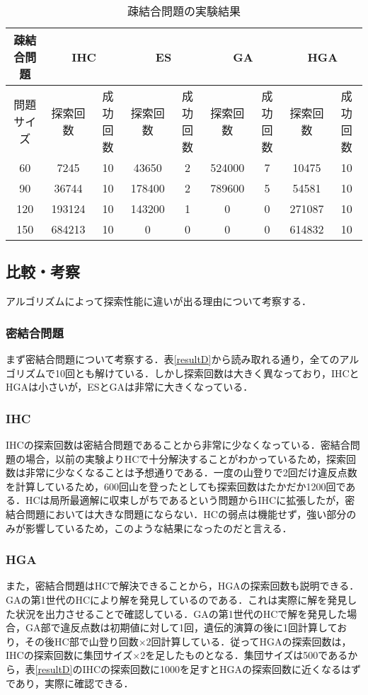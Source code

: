 \documentclass[a4j]{jarticle}
\begin{document}
\begin{table}[H]
 \begin{center}
  \caption{疎結合問題の実験結果}
  \label{resultS}
  \begin{tabular}[t]{|c|c|c|c|c|c|c|c|c|} \hline
   疎結合問題 & \multicolumn{2}{|c|}{IHC} & \multicolumn{2}{|c|}{ES} & \multicolumn{2}{|c|}{GA} & \multicolumn{2}{|c|}{HGA} \\ \hline
問題サイズ & 探索回数 & 成功回数 & 探索回数 & 成功回数 & 探索回数 & 成功回数 & 探索回数 & 成功回数 \\ \hline \hline
60 & 7245 & 10 & 43650 & 2 & 524000 & 7 & 10475 & 10 \\\hline
90 & 36744 & 10 & 178400 & 2 & 789600 & 5 & 54581 & 10 \\\hline
120 & 193124 & 10 & 143200 & 1 & 0 & 0 & 271087 & 10 \\\hline
150 & 684213 & 10 & 0 & 0 & 0 & 0 & 614832 & 10 \\\hline
  \end{tabular}
 \end{center}
\end{table}

\subsection{比較・考察}
アルゴリズムによって探索性能に違いが出る理由について考察する．
\subsubsection{密結合問題}
まず密結合問題について考察する．表\ref{resultD}から読み取れる通り，全てのアルゴリズムで10回とも解けている．しかし探索回数は大きく異なっており，IHCとHGAは小さいが，ESとGAは非常に大きくなっている．
\subsubsection*{IHC}
IHCの探索回数は密結合問題であることから非常に少なくなっている．密結合問題の場合，以前の実験よりHCで十分解決することがわかっているため，探索回数は非常に少なくなることは予想通りである．一度の山登りで2回だけ違反点数を計算しているため，600回山を登ったとしても探索回数はたかだか1200回である．HCは局所最適解に収束しがちであるという問題からIHCに拡張したが，密結合問題においては大きな問題にならない．HCの弱点は機能せず，強い部分のみが影響しているため，このような結果になったのだと言える．
\subsubsection*{HGA}
また，密結合問題はHCで解決できることから，HGAの探索回数も説明できる．GAの第1世代のHCにより解を発見しているのである．これは実際に解を発見した状況を出力させることで確認している．GAの第1世代のHCで解を発見した場合，GA部で違反点数は初期値に対して1回，遺伝的演算の後に1回計算しており，その後HC部で山登り回数$\times 2$回計算している．従ってHGAの探索回数は，IHCの探索回数に集団サイズ$\times 2$を足したものとなる．集団サイズは500であるから，表\ref{resultD}のIHCの探索回数に1000を足すとHGAの探索回数に近くなるはずであり，実際に確認できる．
\end{document}
